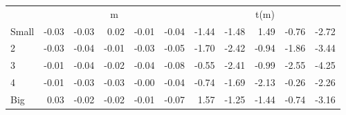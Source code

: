 \begin{table}[!ht]
\begin{tabular}{lrrrrrrrrrr}
  
     & \multicolumn{5}{c}{m} & \multicolumn{5}{c}{t(m)}   \\
     \cmidrule(r){2-6} \cmidrule(r){7-11} 
    Small  & -0.03  & -0.03  & 0.02  & -0.01  & -0.04  & -1.44  & -1.48  & 1.49  & -0.76  & -2.72   \\
    2  & -0.03  & -0.04  & -0.01  & -0.03  & -0.05  & -1.70  & -2.42  & -0.94  & -1.86  & -3.44   \\
    3  & -0.01  & -0.04  & -0.02  & -0.04  & -0.08  & -0.55  & -2.41  & -0.99  & -2.55  & -4.25   \\
    4  & -0.01  & -0.03  & -0.03  & -0.00  & -0.04  & -0.74  & -1.69  & -2.13  & -0.26  & -2.26   \\
    Big  & 0.03  & -0.02  & -0.02  & -0.01  & -0.07  & 1.57  & -1.25  & -1.44  & -0.74  & -3.16   \\
    
  
  \bottomrule
\end{tabular}
\label{tbl:25_Size_Acc_F17}
\end{table}
